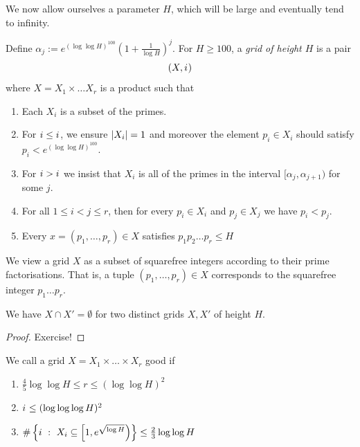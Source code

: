 \documentclass{lecturenotes}
\numberwithin{equation}{section}
\begin{document}
We now allow ourselves a parameter $H$, which will be large and eventually tend to infinity.
\begin{definition}
    Define $\alpha_j:=e^{(\log\log H)^{100}}(1+\frac{1}{\log H})^j$.  For $H\geq 100$, a \emph{grid of height $H$} is a pair
    \[(X, i_{\small})\]
    where $X=X_1\times\dots X_r$ is a product such that
    \begin{enumerate}
        \item Each $X_i$ is a subset of the primes.
        \item For $i\leq i_{\small}$, we ensure $\left|{X_i}\right|=1$ and moreover the element $p_i\in X_i$ should satisfy $p_i<e^{(\log\log H)^{100}}$.
        \item For $i>i_{\small}$ we insist that $X_i$ is all of the primes in the interval $[\alpha_j,\alpha_{j+1})$ for some $j$.
        \item For all $1\leq i<j\leq r$, then for every $p_i\in X_i$ and $p_j\in X_j$ we have $p_i<p_j$.
        \item Every $x=(p_{1},\dots,p_r)\in X$ satisfies $p_1p_2\dots p_r\leq H$
    \end{enumerate}
\end{definition}
We view a grid $X$ as a subset of squarefree integers according to their prime factorisations.  That is, a tuple $(p_1,\dots,p_r)\in X$ corresponds to the squarefree integer $p_1\dots p_r$.  

\begin{theorem} We have $X\cap X'=\emptyset$ for two distinct grids $X,X'$ of height $H$.
\end{theorem}
\begin{proof}
    Exercise!
\end{proof}
\begin{definition}
    We call a grid $X=X_1\times\dots\times X_r$ good if 
    \begin{enumerate}
        \item\label{goodgrid1} $\frac{4}{5}\log\log H\leq r\leq (\log\log H)^2$
        \item\label{goodgrid2} $i_{\small}\leq (\log\log\log H)^2$
        \item\label{goodgrid3} $\#\left\{{i~:~X_i\subseteq \left[1,e^{\sqrt{\log H}}\right)}\right\}\leq \frac{2}{3}\log\log H$
    \end{enumerate}
\end{definition}
\end{document}
